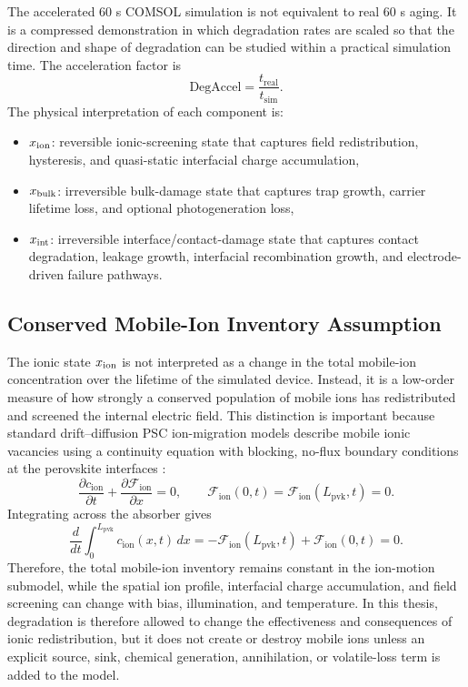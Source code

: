 The accelerated 60 s COMSOL simulation is not equivalent to real 60 s aging.
It is a compressed demonstration in which degradation rates are scaled so that
the direction and shape of degradation can be studied within a practical
simulation time. The acceleration factor is
\begin{equation}
\mathrm{DegAccel}=\frac{t_{\mathrm{real}}}{t_{\mathrm{sim}}}.
\end{equation}
The physical interpretation of each component is:
\begin{itemize}
\item $x_{\mathrm{ion}}$: reversible ionic-screening state that captures field
redistribution, hysteresis, and quasi-static interfacial charge
accumulation,
\item $x_{\mathrm{bulk}}$: irreversible bulk-damage state that captures trap growth,
carrier lifetime loss, and optional photogeneration loss,
\item $x_{\mathrm{int}}$: irreversible interface/contact-damage state that captures
contact degradation, leakage growth, interfacial recombination growth, and
electrode-driven failure pathways.
\end{itemize}

\subsection{Conserved Mobile-Ion Inventory Assumption}

The ionic state $x_{\mathrm{ion}}$ is not interpreted as a change in the total mobile-ion
concentration over the lifetime of the simulated device. Instead, it is a
low-order measure of how strongly a conserved population of mobile ions has
redistributed and screened the internal electric field. This distinction is
important because standard drift--diffusion PSC ion-migration models describe
mobile ionic vacancies using a continuity equation with blocking, no-flux
boundary conditions at the perovskite interfaces \cite{Courtier_2017}:
\begin{equation}
\frac{\partial c_{\mathrm{ion}}}{\partial t}
+ \frac{\partial \mathcal{F}_{\mathrm{ion}}}{\partial x}=0,
\qquad
\mathcal{F}_{\mathrm{ion}}(0,t)=
\mathcal{F}_{\mathrm{ion}}(L_{\mathrm{pvk}},t)=0.
\end{equation}
Integrating across the absorber gives
\begin{equation}
\frac{d}{dt}\int_{0}^{L_{\mathrm{pvk}}}
 c_{\mathrm{ion}}(x,t)\,dx
= -\mathcal{F}_{\mathrm{ion}}(L_{\mathrm{pvk}},t)
+ \mathcal{F}_{\mathrm{ion}}(0,t)=0.
\end{equation}
Therefore, the total mobile-ion inventory remains constant in the ion-motion
submodel, while the spatial ion profile, interfacial charge accumulation, and
field screening can change with bias, illumination, and temperature. In this
thesis, degradation is therefore allowed to change the effectiveness and
consequences of ionic redistribution, but it does not create or destroy mobile
ions unless an explicit source, sink, chemical generation, annihilation, or
volatile-loss term is added to the model.

